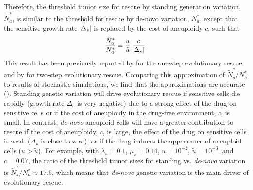 \documentclass[12pt]{extarticle}
\begin{document}
Therefore, the threshold tumor size for rescue by standing generation variation, $\tilde{N}^*_{a}$, is similar to the threshold for rescue by de-novo variation, $N^*_a$, except that the sensitive growth rate $\abs{\Delta_s}$ is replaced by the cost of aneuploidy $c$, such that
\begin{equation}\label{eq:Nsgv}
\frac{\tilde{N}^*_{a}}{N^*_{a}} = \frac{u}{\tilde{u}} \; \frac{c}{\abs{\Delta_s}}.
\end{equation}
This result has been previously reported by \citet{orr2008population} for the one-step evolutionary rescue and by \citet{martin2013probability} for two-step evolutionary rescue. %
Comparing this approximation of $\tilde{N}^*_{a}/N^*_{a}$ to results of stochastic simulations, we find that the approximations are accurate (). 
Standing genetic variation will drive evolutionary rescue if sensitive cells die rapidly (growth rate $\Delta_s$ is very negative) due to a strong effect of the drug on sensitive cells or if the cost of aneuploidy in the drug-free environment, $c$, is small.  
In contrast, \emph{de-novo} aneuploid cells will have a greater contribution to rescue if the cost of aneuploidy, $c$, is large, the effect of the drug on sensitive cells is weak ($\Delta_s$ is close to zero), or if the drug induces the appearance of aneuploid cells ($u > \tilde u$).
For example, with  $\lambda_s=0.1$, $\mu_s=0.14$, $u=10^{-2}$, $\tilde{u}=10^{-3}$, and $c=0.07$, the ratio of the threshold tumor sizes for standing vs. \emph{de-novo} variation is $\tilde{N}^*_a/N^*_a \approx 17.5$, which means that \emph{de-novo} genetic variation is  the main driver of evolutionary rescue.
\end{document}
